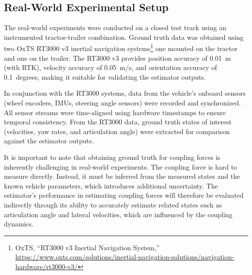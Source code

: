 \documentclass[conference]{IEEEtran}
\begin{document}
\subsection{Real-World Experimental Setup}
The real-world experiments were conducted on a closed test track using an instrumented tractor-trailer combination. Ground truth data was obtained using two OxTS RT3000 v3 inertial navigation systems\footnote{OxTS, ``RT3000 v3 Inertial Navigation System,'' \url{https://www.oxts.com/solutions/inertial-navigation-solutions/navigation-hardware/rt3000-v3/}} one mounted on the tractor and one on the trailer. The RT3000 v3 provides position accuracy of 0.01~m (with RTK), velocity accuracy of 0.05~m/s, and orientation accuracy of 0.1~degrees, making it suitable for validating the estimator outputs.

In conjunction with the RT3000 systems, data from the vehicle's onboard sensors (wheel encoders, IMUs, steering angle sensors) were recorded and synchronized. All sensor streams were time-aligned using hardware timestamps to ensure temporal consistency. From the RT3000 data, ground truth states of interest (velocities, yaw rates, and articulation angle) were extracted for comparison against the estimator outputs. 

It is important to note that obtaining ground truth for coupling forces is inherently challenging in real-world experiments. The coupling force is hard to measure directly. Instead, it must be inferred from the measured states and the known vehicle parameters, which introduces additional uncertainty. The estimator's performance in estimating coupling forces will therefore be evaluated indirectly through its ability to accurately estimate related states such as articulation angle and lateral velocities, which are influenced by the coupling dynamics.

\end{document}
